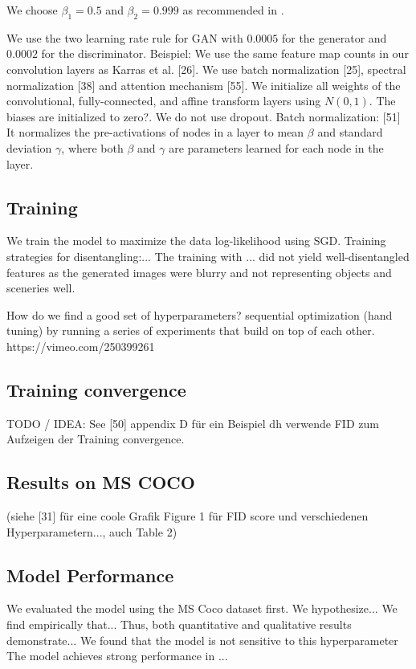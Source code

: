 \documentclass[11pt,a4paper]{article}
\begin{document}
We choose $\beta_1 = 0.5$ and $\beta_2 = 0.999$ as recommended in \cite{1807.04720}.

We use the two learning rate rule for GAN \cite{1706.08500} with $0.0005$ for the generator and $0.0002$ for the discriminator.
Beispiel: We use the same feature map counts in our convolution layers as Karras et al. [26]. We use batch normalization [25], spectral normalization [38] and attention mechanism [55].
We initialize all weights of the convolutional, fully-connected, and affine transform layers using $N(0, 1)$. The biases are initialized to zero?.
We do not use dropout.
Batch normalization: [51] It normalizes the pre-activations of nodes in a layer to mean $\beta$ and standard deviation $\gamma$, where both $\beta$ and $\gamma$ are parameters learned for each node in the layer.

\subsection{Training}
We train the model to maximize the data log-likelihood using SGD.
Training strategies for disentangling:...
The training with ... did not yield well-disentangled features as the generated images were blurry and not representing objects and sceneries well. 

\par How do we find a good set of hyperparameters? sequential optimization (hand tuning) by running a series of experiments that build on top of each other. https://vimeo.com/250399261

\subsection{Training convergence}
TODO / IDEA: See [50] appendix D für ein Beispiel dh verwende FID zum Aufzeigen der Training convergence.

\subsection{Results on MS COCO}
(siehe [31] für eine coole Grafik Figure 1 für FID score und verschiedenen Hyperparametern..., auch Table 2)

\subsection{Model Performance}
We evaluated the model using the MS Coco dataset first.
We hypothesize...
We find empirically that...
Thus, both quantitative and qualitative results demonstrate...
We found that the model is not sensitive to this hyperparameter
The model achieves strong performance in ...
\end{document}
